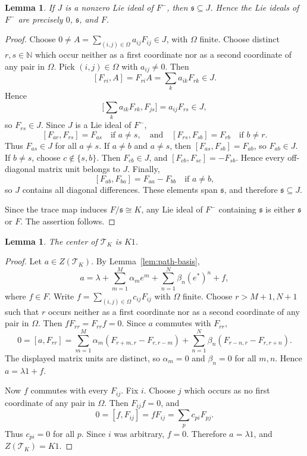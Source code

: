 \documentclass[11pt]{article}
\numberwithin{equation}{section}
\theoremstyle{plain}
\newtheorem{lemma}[theorem]{Lemma}
\theoremstyle{definition}
\numberwithin{equation}{section}
\newcommand{\T}{\mathscr T_K}
\begin{document}
\begin{lemma}\label{lem:F-lie-ideals}
If $J$ is a nonzero Lie ideal of $F^-$, then $\mathfrak s\subseteq J$. Hence the Lie ideals of $F^-$ are precisely $0$, $\mathfrak s$, and $F$.
\end{lemma}

\begin{proof}
Choose $0\neq A=\sum_{(i,j)\in\Omega}a_{ij}F_{ij}\in J$, with $\Omega$ finite. Choose distinct $r,s\in\mathbb N$ which occur neither as a first coordinate nor as a second coordinate of any pair in $\Omega$. Pick $(i,j)\in\Omega$ with $a_{ij}\neq0$. Then
$$
[F_{ri},A]=F_{ri}A=\sum_k a_{ik}F_{rk}\in J.
$$
Hence
$$
\big[\sum_k a_{ik}F_{rk},F_{js}\big]=a_{ij}F_{rs}\in J,
$$
so $F_{rs}\in J$. Since $J$ is a Lie ideal of $F^-$,
$$
[F_{ar},F_{rs}]=F_{as}\quad\text{if }a\neq s,
\quad
\text{and}
\quad
[F_{rs},F_{sb}]=F_{rb}\quad\text{if }b\neq r.
$$
Thus $F_{as}\in J$ for all $a\neq s$. If $a\neq b$ and $a\neq s$, then $[F_{as},F_{sb}]=F_{ab}$, so $F_{ab}\in J$. If $b\neq s$, choose $c\notin\{s,b\}$. Then $F_{cb}\in J$, and $[F_{cb},F_{sc}]=-F_{sb}$. Hence every off-diagonal matrix unit belongs to $J$. Finally,
$$
[F_{ab},F_{ba}]=F_{aa}-F_{bb}\quad\text{if }a\neq b,
$$
so $J$ contains all diagonal differences. These elements span $\mathfrak s$, and therefore $\mathfrak s\subseteq J$.

Since the trace map induces $F/\mathfrak s\cong K$, any Lie ideal of $F^-$ containing $\mathfrak s$ is either $\mathfrak s$ or $F$. The assertion follows.
\end{proof}

\begin{lemma}\label{lem:center}
The center of $\T$ is $K1$.
\end{lemma}

\begin{proof}
Let $a\in Z(\T)$. By Lemma~\ref{lem:path-basis},
$$
a=\lambda+\sum_{m=1}^M\alpha_m e^m+\sum_{n=1}^N\beta_n(e^*)^n+f,
$$
where $f\in F$.
Write $f=\sum_{(i,j)\in\Omega}c_{ij}F_{ij}$ with $\Omega$ finite. Choose $r>M+1,N+1$ such that $r$ occurs neither as a first coordinate nor as a second coordinate of any pair in $\Omega$. Then $fF_{rr}=F_{rr}f=0$. Since $a$ commutes with $F_{rr}$,
$$
0=[a,F_{rr}]
=\sum_{m=1}^M\alpha_m(F_{r+m,r}-F_{r,r-m})
+\sum_{n=1}^N\beta_n(F_{r-n,r}-F_{r,r+n}).
$$
The displayed matrix units are distinct, so $\alpha_m=0$ and $\beta_n=0$ for all $m,n$. Hence $a=\lambda1+f$.

Now $f$ commutes with every $F_{ij}$. Fix $i$. Choose $j$ which occurs as no first coordinate of any pair in $\Omega$. Then $F_{ij}f=0$, and
$$
0=[f,F_{ij}]=fF_{ij}=\sum_p c_{pi}F_{pj}.
$$
Thus $c_{pi}=0$ for all $p$. Since $i$ was arbitrary, $f=0$. Therefore $a=\lambda1$, and $Z(\T)=K1$.
\end{proof}
\end{document}
